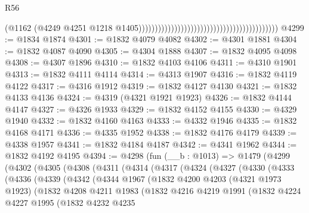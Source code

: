 \begin{lexlean}{R56}
\begin{coremodule}
                                                                                      (@1162
                                                                                        (@4249
                                                                                          @4251
                                                                                          @1218
                                                                                          @1405)))))))))))))))))))))))))))))))))))))))))))
@4299 := @1834 @1874
@4301 := @1832 @4079 @4082
@4302 := @4301 @1881
@4304 := @1832 @4087 @4090
@4305 := @4304 @1888
@4307 := @1832 @4095 @4098
@4308 := @4307 @1896
@4310 := @1832 @4103 @4106
@4311 := @4310 @1901
@4313 := @1832 @4111 @4114
@4314 := @4313 @1907
@4316 := @1832 @4119 @4122
@4317 := @4316 @1912
@4319 := @1832 @4127 @4130
@4321 := @1832 @4133 @4136
@4324 := @4319 (@4321 @1921 @1923)
@4326 := @1832 @4144 @4147
@4327 := @4326 @1933
@4329 := @1832 @4152 @4155
@4330 := @4329 @1940
@4332 := @1832 @4160 @4163
@4333 := @4332 @1946
@4335 := @1832 @4168 @4171
@4336 := @4335 @1952
@4338 := @1832 @4176 @4179
@4339 := @4338 @1957
@4341 := @1832 @4184 @4187
@4342 := @4341 @1962
@4344 := @1832 @4192 @4195
@4394 := @4298
    (fun (__b : @1013) =>
    @1479
      (@4299
        (@4302
          (@4305
            (@4308
              (@4311
                (@4314
                  (@4317
                    (@4324
                      (@4327
                        (@4330
                          (@4333
                            (@4336
                              (@4339
                                (@4342
                                  (@4344
                                    @1967
                                    (@1832
                                      @4200
                                      @4203
                                      (@4321 @1973 @1923)
                                      (@1832
                                        @4208
                                        @4211
                                        @1983
                                        (@1832
                                          @4216
                                          @4219
                                          @1991
                                          (@1832
                                            @4224
                                            @4227
                                            @1995
                                            (@1832
                                              @4232
                                              @4235

\end{coremodule}
\end{lexlean}
